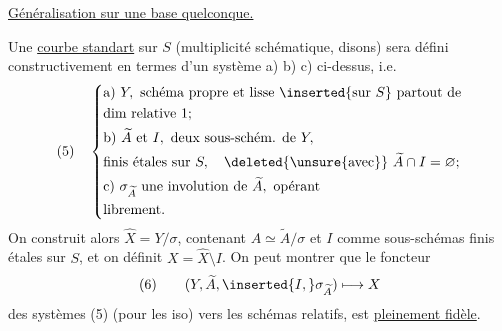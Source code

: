 \uline{Généralisation sur une base quelconque.}

Une \uline{courbe standart} sur $S$ (multiplicité schématique, disons) sera défini constructivement en termes d'un système a) b) c)  ci-dessus, i.e.
\[
(5)\quad\left\{\begin{aligned}
&\text{a) }Y,\text{ schéma propre et lisse }\inserted{\text{sur }S}\text{ partout de}\\
&\text{dim relative }1;\\
&\text{b) }\widetilde A\text{ et }I,\text{ deux sous-schém. de }Y,\\
&\text{finis étales sur }S,\quad\deleted{\unsure{\text{avec}}}\ \widetilde A\cap I=\varnothing;\\
&\text{c) }\sigma_{\widetilde A}\text{ une involution de }\widetilde A,\text{ opérant}\\
&\text{librement.}
\end{aligned}\right.
\]
On construit alors $\widehat X=Y/\sigma$, contenant $A\simeq\widetilde A/\sigma$ et $I$ comme sous-schémas  finis étales sur $S$, et on définit $X=\widehat X\setminus I$. On peut montrer que le foncteur
\[
(6)\qquad(Y,\widetilde A,\inserted{I,}\sigma_{\widetilde A})\longmapsto X
\]
des systèmes (5) (pour les iso) vers les schémas relatifs,  est \uline{pleinement fidèle}.
